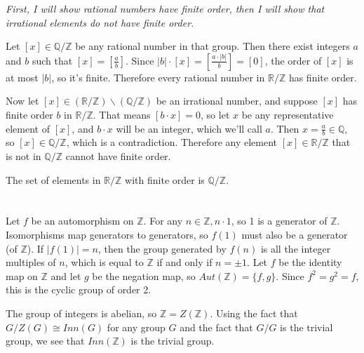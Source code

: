 \documentclass[12pt]{article}
\begin{document}
\textit{First, I will show rational numbers have finite order, then I will show that irrational elements do not have finite order.}
\par
Let $[x] \in \mathbb{Q} / \mathbb{Z}$ be any rational number in that group. Then there exist integers $a$ and $b$ such that $[x] = [\frac{a}{b}] $. Since $|b| \cdot [x] = [\frac{a \cdot |b|}{b}] = [0]$, the order of $[x]$ is at most $|b|$, so it's finite. Therefore every rational number in $ \mathbb{R} / \mathbb{Z}$ has finite order.
\par
Now let $[x] \in (\mathbb{R} / \mathbb{Z}) \backslash ( \mathbb{Q} / \mathbb{Z})$ be an irrational number, and suppose $[x]$ has finite order $b$ in $ \mathbb{R} / \mathbb{Z}$. That means $[b \cdot x] = 0$, so let $x$ be any representative element of $[x]$, and $b \cdot x$ will be an integer, which we'll call $a$. Then $x = \frac{a}{b} \in \mathbb{Q}$, so $[x] \in \mathbb{Q} / \mathbb{Z}$, which is a contradiction. Therefore any element $[x] \in \mathbb{R} / \mathbb{Z}$ that is not in $ \mathbb{Q} / \mathbb{Z}$ cannot have finite order.
\par
The set of elements in $ \mathbb{R} / \mathbb{Z}$ with finite order is $ \mathbb{Q} / \mathbb{Z}$.

\section{}
\noindent{}\bigskip

Let $f$ be an automorphism on $ \mathbb{Z}$. For any $n \in \mathbb{Z}, n \cdot 1$, so 1 is a generator of $\mathbb{Z}$. Isomorphisms map generators to generators, so $f(1)$ must also be a generator (of $\mathbb{Z}$). If $|f(1)| = n$, then the group generated by $f(n)$ is all the integer multiples of $n$, which is equal to $ \mathbb{Z}$ if and only if $n= \pm 1$. Let $f$ be the identity map on $ \mathbb{Z}$ and let $g$ be the negation map, so $Aut( \mathbb{Z} ) = \{f, g\}$. Since $f^2=g^2=f$, this is the cyclic group of order 2.
\par
The group of integers is abelian, so $ \mathbb{Z} = Z( \mathbb{Z})$. Using the fact that $G/Z(G) \cong Inn(G)$ for any group $G$ and the fact that $G/G$ is the trivial group, we see that $Inn( \mathbb{Z})$ is the trivial group.

\section{}
\noindent{}\bigskip
\end{document}
